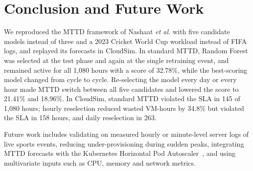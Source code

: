 \documentclass[journal,onecolumn,11pt]{IEEEtran}
\begin{document}
\section{Conclusion and Future Work}\label{sec:conclusion}
We reproduced the MTTD framework of Nashaat \emph{et al.} with five candidate models instead of three and a 2023 Cricket World Cup workload instead of FIFA logs, and replayed its forecasts in CloudSim. In standard MTTD, Random Forest was selected at the test phase and again at the single retraining event, and remained active for all 1,080 hours with a score of 32.78\%, while the best-scoring model changed from cycle to cycle. Re-selecting the model every day or every hour made MTTD switch between all five candidates and lowered the score to 21.41\% and 18.96\%. In CloudSim, standard MTTD violated the SLA in 145 of 1,080 hours; hourly reselection reduced wasted VM-hours by 34.8\% but violated the SLA in 158 hours, and daily reselection in 263.

Future work includes validating on measured hourly or minute-level server logs of live sports events, reducing under-provisioning during sudden peaks, integrating MTTD forecasts with the Kubernetes Horizontal Pod Autoscaler~\cite{k8shpa}, and using multivariate inputs such as CPU, memory and network metrics.
\end{document}
